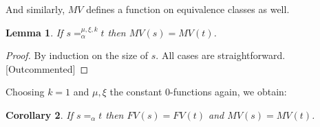 \documentclass{lmcs}
\theoremstyle{theorem}\newtheorem{theorem}{Theorem}
\theoremstyle{theorem}\newtheorem{lemma}[theorem]{Lemma}
\theoremstyle{theorem}\newtheorem{corollary}[theorem]{Corollary}
\theoremstyle{definition}\newtheorem{definition}[theorem]{Definition}
\theoremstyle{definition}\newtheorem{example}[theorem]{Example}
\newcommand{\Vfree}{\mathcal{V}_{\mathit{nonb}}}
\newcommand{\Vbound}{\mathcal{V}_{\mathit{binder}}}
\newcommand{\FV}{\mathit{FV}}
\newcommand{\FMV}{\mathit{MV}}
\newcommand{\identifier}[1]{\mathtt{#1}}
\newcommand{\afun}{\identifier{f}}
\newcommand{\avar}{x}
\newcommand{\Bvar}{Y}
\newcommand{\abs}[2]{\lambda #1.#2}
\newcommand{\meta}[2]{#1\langle#2\rangle}
\newcommand{\tuple}[2]{\llparenthesis #1,\dots,#2 \rrparenthesis}
\begin{document}
And similarly, $\FMV$ defines a function on equivalence classes as well.

\begin{lemma}\label{lem:alphamvar}
If $s =_\alpha^{\mu,\xi,k} t$ then $\FMV(s) = \FMV(t)$.
\end{lemma}

\begin{proof}
By induction on the size of $s$.
All cases are straightforward. [Outcommented]
\end{proof}

Choosing $k = 1$ and $\mu,\xi$ the constant $0$-functions again, we obtain:

\begin{corollary}\label{corr:alphafreevar}
If $s =_\alpha t$ then $\FV(s) = \FV(t)$ and $\FMV(s) = \FMV(t)$.
\end{corollary}
\end{document}
